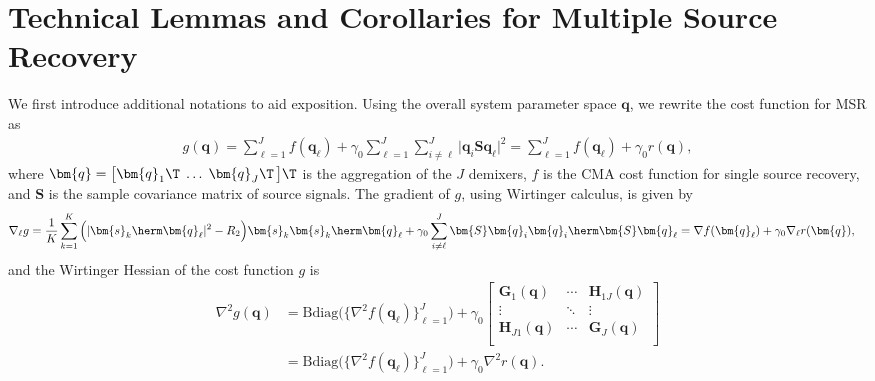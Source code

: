 \section{Technical Lemmas and Corollaries for Multiple Source Recovery} \label{appdx:wfcma_msr}

We first introduce additional notations to aid exposition. Using the overall system parameter space $\bm{q}$, we rewrite the cost function for MSR as
\begin{align}
	g(\bm{q})=\sum_{\ell=1}^J f(\bm{q}_{\ell}) +\gamma_0\sum_{\ell=1}^J\sum_{i\neq {\ell}}^J\big|\bm{q}_{i}\bm{S}\bm{q}_{\ell}\big|^2 = \sum_{\ell=1}^J f(\bm{q}_{\ell}) +\gamma_0 r(\bm{q}), \label{eqn:cma_msr_qspace}
\end{align}
where $\bm{q}=\big[\bm{q}_1\T\;\ldots\;\bm{q}_J\T\,\big]\T$ is the aggregation of the $J$ demixers, $f$ is the CMA cost function for single source recovery, and $\bm{S}$ is the sample covariance matrix of source signals.
The gradient of $g$, using Wirtinger calculus, is given by
\begin{align}
	\nabla_{\ell} g&=\frac{1}{K}\sum_{k=1}^K\Big(|\bm{s}_k\herm\bm{q}_{\ell}|^2-R_2\Big)\bm{s}_k\bm{s}_k\herm\bm{q}_{\ell}+\gamma_0\sum_{i\neq {\ell}}^J\bm{S}\bm{q}_{i}\bm{q}_{i}\herm\bm{S}\bm{q}_{\ell} = \nabla f(\bm{q}_{\ell}) + \gamma_0 \nabla_{\ell} r(\bm{q}), \label{eqn:wfgradient_msr}
\end{align}
and the Wirtinger Hessian of the cost function $g$ is
\begin{align}
	\nabla^2 g(\bm{q})
	&= \mathrm{Bdiag}\Big(\big\{\nabla^2 f(\bm{q}_{\ell})\big\}_{{\ell}=1}^J\Big)
	+\gamma_0\begin{bmatrix}
		\bm{G}_{1}(\bm{q}) & \cdots&\bm{H}_{1 J}(\bm{q})\\
		\vdots & \ddots&\vdots\\
		\bm{H}_{J 1}(\bm{q}) & \cdots&\bm{G}_{J}(\bm{q})\\
	\end{bmatrix} 
	\nonumber\\
	&=
	\mathrm{Bdiag}\Big(\big\{\nabla^2 f(\bm{q}_{\ell})\big\}_{{\ell}=1}^J\Big)
	+\gamma_0\nabla^2 r(\bm{q}).\label{eqn:hessian_msr}
\end{align}
